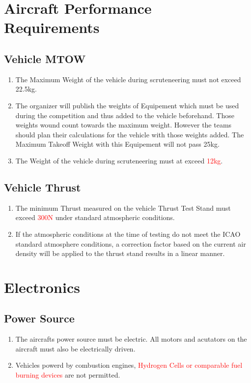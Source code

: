 \documentclass{article}
\begin{document}
\section{Aircraft Performance Requirements}

\subsection{Vehicle MTOW}
\begin{enumerate}
  \item The Maximum Weight of the vehicle during scruteneering must not exceed 22.5kg.
  \item The organizer will publish the weights of Equipement which must be used during the competition and thus added to the vehicle beforehand. Those weights wound count towards the maximum weight. 
  However the teams should plan their calculations for the vehicle with those weights added. The Maximum Takeoff Weight with this Equipement will not pass 25kg.  
  \item The Weight of the vehicle during scruteneering must at exceed \textcolor{red}{12kg}.  
\end{enumerate}

\subsection{Vehicle Thrust}
\begin{enumerate}
  \item The minimum Thrust measured on the vehicle Thrust Test Stand must exceed \textcolor{red}{300N} under standard atmospheric conditions.
  \item If the atmospheric conditions at the time of testing do not meet the ICAO standard atmosphere conditions, a correction factor based on the current air density will be applied to the thrust stand results in a linear manner.
\end{enumerate}


\section{Electronics}


\subsection{Power Source}
\begin{enumerate}
  \item The aircrafts power source must be electric. All motors and acutators on the aircraft must also be electrically driven.
  \item Vehicles powerd by combustion engines, \textcolor{red}{Hydrogen Cells or comparable fuel burning devices} are not permitted. 
\end{enumerate}
\end{document}
